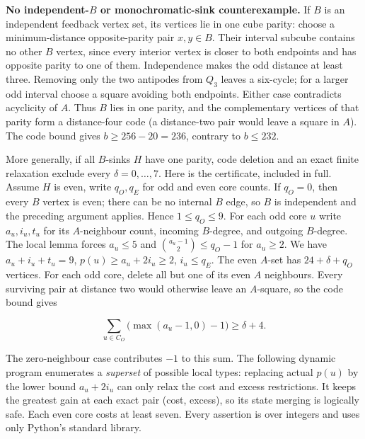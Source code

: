 \documentclass[11pt,a4paper]{article}
\begin{document}
\textbf{No independent-\(B\) or monochromatic-sink counterexample.} If \(B\) is an independent feedback vertex set, its vertices lie in one cube parity: choose a minimum-distance opposite-parity pair \(x,y\in B\). Their interval subcube contains no other \(B\) vertex, since every interior vertex is closer to both endpoints and has opposite parity to one of them. Independence makes the odd distance at least three. Removing only the two antipodes from \(Q_3\) leaves a six-cycle; for a larger odd interval choose a square avoiding both endpoints. Either case contradicts acyclicity of \(A\). Thus \(B\) lies in one parity, and the complementary vertices of that parity form a distance-four code (a distance-two pair would leave a square in \(A\)). The code bound gives \(b\ge256-20=236\), contrary to \(b\le232\).

More generally, if all \(B\)-sinks \(H\) have one parity, code deletion and an exact finite relaxation exclude every \(\delta=0,\ldots,7\). Here is the certificate, included in full. Assume \(H\) is even, write \(q_O,q_E\) for odd and even core counts. If \(q_O=0\), then every \(B\) vertex is even; there can be no internal \(B\) edge, so \(B\) is independent and the preceding argument applies. Hence \(1\le q_O\le9\). For each odd core \(u\) write \(a_u,i_u,t_u\) for its \(A\)-neighbour count, incoming \(B\)-degree, and outgoing \(B\)-degree. The local lemma forces \(a_u\le5\) and \(\binom{a_u-1}{2}\le q_O-1\) for \(a_u\ge2\). We have \(a_u+i_u+t_u=9\), \(p(u)\ge a_u+2i_u\ge2\), \(i_u\le q_E\). The even \(A\)-set has \(24+\delta+q_O\) vertices. For each odd core, delete all but one of its even \(A\) neighbours. Every surviving pair at distance two would otherwise leave an \(A\)-square, so the code bound gives

\[
\sum_{u\in C_O}\bigl(\max(a_u-1,0)-1\bigr)\ge\delta+4.\tag{10}
\]

The zero-neighbour case contributes \(-1\) to this sum. The following dynamic program enumerates a \emph{superset} of possible local types: replacing actual \(p(u)\) by the lower bound \(a_u+2i_u\) can only relax the cost and excess restrictions. It keeps the greatest gain at each exact pair (cost, excess), so its state merging is logically safe. Each even core costs at least seven. Every assertion is over integers and uses only Python's standard library.
\end{document}
